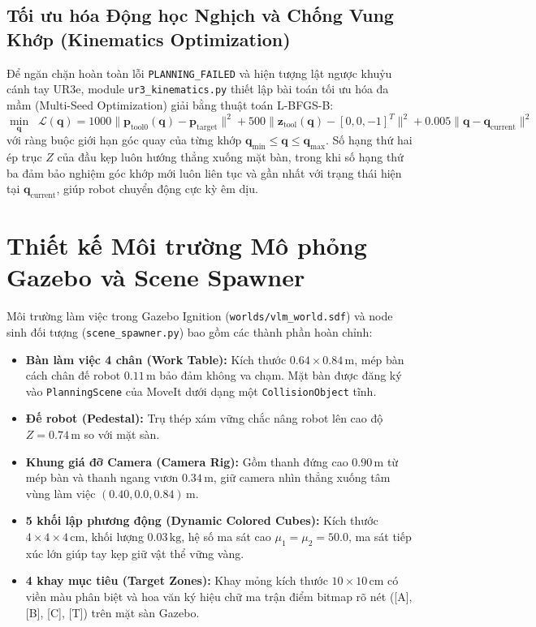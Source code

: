 \documentclass[a4paper,12pt]{article}
\begin{document}
\subsection{Tối ưu hóa Động học Nghịch và Chống Vung Khớp (Kinematics Optimization)}
Để ngăn chặn hoàn toàn lỗi \texttt{PLANNING\_FAILED} và hiện tượng lật ngược khuỷu cánh tay UR3e, module \texttt{ur3\_kinematics.py} thiết lập bài toán tối ưu hóa đa mầm (Multi-Seed Optimization) giải bằng thuật toán L-BFGS-B:
\begin{equation}
\min_{\mathbf{q}} \;\; \mathcal{L}(\mathbf{q}) = 1000 \|\mathbf{p}_{\text{tool0}}(\mathbf{q}) - \mathbf{p}_{\text{target}}\|^2 + 500 \|\mathbf{z}_{\text{tool}}(\mathbf{q}) - [0, 0, -1]^T\|^2 + 0.005 \|\mathbf{q} - \mathbf{q}_{\text{current}}\|^2
\end{equation}
với ràng buộc giới hạn góc quay của từng khớp $\mathbf{q}_{\min} \le \mathbf{q} \le \mathbf{q}_{\max}$. Số hạng thứ hai ép trục $Z$ của đầu kẹp luôn hướng thẳng xuống mặt bàn, trong khi số hạng thứ ba đảm bảo nghiệm góc khớp mới luôn liên tục và gần nhất với trạng thái hiện tại $\mathbf{q}_{\text{current}}$, giúp robot chuyển động cực kỳ êm dịu.

\section{Thiết kế Môi trường Mô phỏng Gazebo và Scene Spawner}
Môi trường làm việc trong Gazebo Ignition (\texttt{worlds/vlm_world.sdf}) và node sinh đối tượng (\texttt{scene_spawner.py}) bao gồm các thành phần hoàn chỉnh:
\begin{itemize}
    \item \textbf{Bàn làm việc 4 chân (Work Table):} Kích thước $0.64\times 0.84\,\text{m}$, mép bàn cách chân đế robot $0.11\,\text{m}$ bảo đảm không va chạm. Mặt bàn được đăng ký vào \texttt{PlanningScene} của MoveIt dưới dạng một \texttt{CollisionObject} tĩnh.
    \item \textbf{Đế robot (Pedestal):} Trụ thép xám vững chắc nâng robot lên cao độ $Z = 0.74\,\text{m}$ so với mặt sàn.
    \item \textbf{Khung giá đỡ Camera (Camera Rig):} Gồm thanh đứng cao $0.90\,\text{m}$ từ mép bàn và thanh ngang vươn $0.34\,\text{m}$, giữ camera nhìn thẳng xuống tâm vùng làm việc $(0.40, 0.0, 0.84)\,\text{m}$.
    \item \textbf{5 khối lập phương động (Dynamic Colored Cubes):} Kích thước $4\times 4\times 4\,\text{cm}$, khối lượng $0.03\,\text{kg}$, hệ số ma sát cao $\mu_1 = \mu_2 = 50.0$, ma sát tiếp xúc lớn giúp tay kẹp giữ vật thể vững vàng.
    \item \textbf{4 khay mục tiêu (Target Zones):} Khay mỏng kích thước $10\times 10\,\text{cm}$ có viền màu phân biệt và hoa văn ký hiệu chữ ma trận điểm bitmap rõ nét ([A], [B], [C], [T]) trên mặt sàn Gazebo.
\end{itemize}
\end{document}
